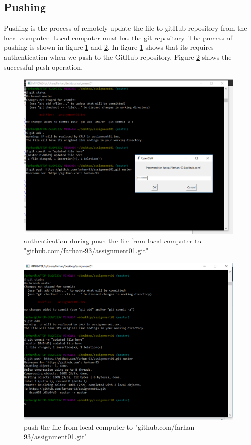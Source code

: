 \documentclass[paper=a4, fontsize=12pt]{scrartcl}
\numberwithin{equation}{section} %
\numberwithin{figure}{section} %
\numberwithin{table}{section} %
\begin{document}
\subsection{Pushing}
Pushing is the process of remotely update the file to gitHub repository from the local computer. Local computer must has the git repository. The process of pushing is shown in figure \ref{cpush} and \ref{cpush1}. In figure \ref{cpush} shows that its requires authentication when we push to the GitHub repository. Figure \ref{cpush1} shows the successful push operation.

\begin{figure}
\includegraphics[width=\linewidth]{push.png}
\caption{authentication during push the file from local computer to "github.com/farhan-93/assignment01.git"}
\label{cpush}
\end{figure}


\begin{figure}
\includegraphics[width=\linewidth]{push1.png}
\caption{push the file from local computer to "github.com/farhan-93/assignment01.git"}
\label{cpush1}
\end{figure}
\end{document}
